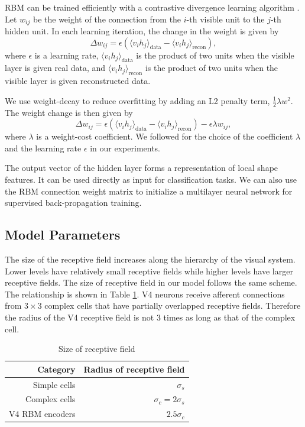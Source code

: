 \documentclass[conference]{IEEEtran}
\begin{document}
RBM can be trained efficiently with a contrastive divergence learning algorithm \cite{hinton2002}.
Let $w_{ij}$ be the weight of the connection from the $i$-th visible unit to the $j$-th hidden unit.
In each learning iteration, the change in the weight is given by
\begin{equation}
\Delta w_{ij}=\epsilon\left(\langle v_i h_j\rangle_\text{data}-\langle v_i h_j\rangle_\text{recon}\right),
\end{equation}
where $\epsilon$ is a learning rate, 
$\langle v_i h_j\rangle_\text{data}$ is the product of two units when the visible layer is given real data,
and $\langle v_i h_j\rangle_\text{recon}$ is the product of two units 
when the visible layer is given reconstructed data.

We use weight-decay \cite{hinton2010}
to reduce overfitting by adding an L2 penalty term, $\frac{1}{2}\lambda w^2$.
The weight change is then given by
\begin{equation}
\Delta w_{ij}=\epsilon\left(\langle v_i h_j\rangle_\text{data}-\langle v_i h_j\rangle_\text{recon}\right)
-\epsilon\lambda w_{ij},
\end{equation}
where $\lambda$ is a weight-cost coefficient.
We followed \cite{hinton2010} for the choice of the coefficient $\lambda$ and the learning rate $\epsilon$
in our experiments.

The output vector of the hidden layer forms a representation of local shape features.
It can be used directly as input for classification tasks.
We can also use the RBM connection weight matrix to initialize a multilayer neural network
for supervised back-propagation training.

\subsection{Model Parameters}

The size of the receptive field increases along the hierarchy of the visual system.
Lower levels have relatively small receptive fields while higher levels have larger receptive fields.
The size of receptive field in our model follows the same scheme.
The relationship is shown in Table \ref{tab:1}.
V4 neurons receive afferent connections from $3\times3$ complex cells
that have partially overlapped receptive fields.
Therefore the radius of the V4 receptive field is not 3 times as long as that of the complex cell.

\begin{table}[h]
\caption{Size of receptive field}
\centering
\begin{tabular}{rr}
\toprule
Category & Radius of receptive field \\
\midrule
Simple cells & $\sigma_s$ \\
Complex cells & $\sigma_c = 2\sigma_s$ \\
V4 RBM encoders & $2.5\sigma_c$\\
\bottomrule
\end{tabular}
\label{tab:1}
\end{table}
\end{document}
